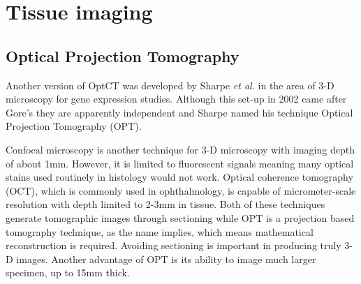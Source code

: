 \documentclass[12pt]{article}
\begin{document}

 









\newpage
\section{Tissue imaging}
\subsection{Optical Projection Tomography}

Another version of OptCT was  developed by Sharpe \textit{et al.} in the area of 3-D microscopy for gene expression studies. \cite{Sharpe:2002jp} Although this set-up in 2002 came after Gore's they are apparently independent and Sharpe named his technique Optical Projection Tomography (OPT).

Confocal microscopy is another technique for 3-D microscopy with  imaging depth of about 1mm. \cite{Webb:1996} However, it is limited to fluorescent signals meaning many optical stains used routinely in histology would not work. Optical coherence tomography (OCT), which is commonly used in ophthalmology, is capable of micrometer-scale resolution with  depth limited to 2-3mm in tissue. \cite{huang1993optical} Both of these techniques generate tomographic images through sectioning while OPT is a projection based tomography technique, as the name implies, which means mathematical reconstruction is required. \cite{Sharpe:2003cm} Avoiding sectioning is important in producing truly 3-D images. \cite{Oldham:2007ku} Another advantage of  OPT is its ability to  image much larger specimen, up to 15mm thick.  \cite{Sharpe:2002jp} 
\end{document}
